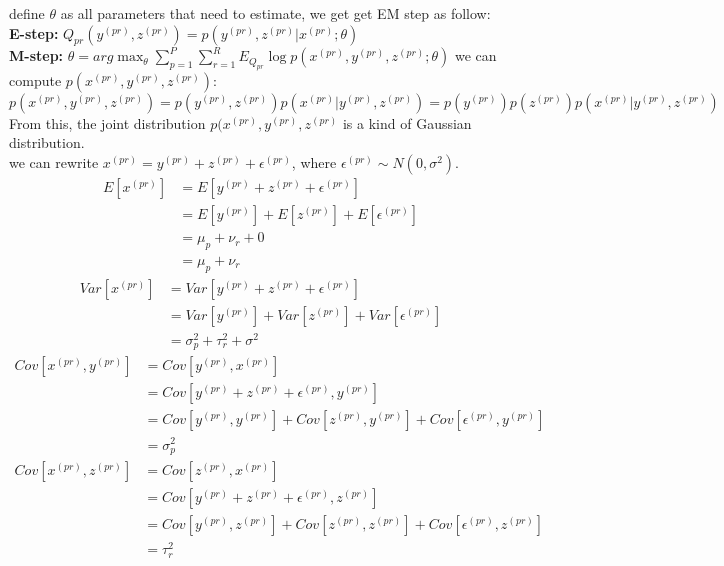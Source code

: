 \documentclass{article}
\theoremstyle{definition}
\theoremstyle{definition}
\theoremstyle{remark}
\begin{document}
define $\theta$ as all parameters that need to estimate, we get get EM step as follow:\\
\textbf{E-step:} $ Q_{pr}(y^{(pr)},z^{(pr)})= p(y^{(pr)},z^{(pr)}|x^{(pr)};\theta)$\\
\textbf{M-step:} $ \theta= arg\max_{\theta}\sum_{p=1}^{P}\sum_{r=1}^{R}E_{Q_{pr}}\log p(x^{(pr)},y^{(pr)},z^{(pr)};\theta)$
we can compute $p(x^{(pr)},y^{(pr)},z^{(pr)})$:
\[p(x^{(pr)},y^{(pr)},z^{(pr)})=p(y^{(pr)},z^{(pr)})p(x^{(pr)}|y^{(pr)},z^{(pr)})=p(y^{(pr)})p(z^{(pr)})p(x^{(pr)}|y^{(pr)},z^{(pr)})\]
From this, the joint distribution $p(x^{(pr)},y^{(pr)},z^{(pr)}$ is a kind of Gaussian distribution.\\
we can rewrite $x^{(pr)}=y^{(pr)}+z^{(pr)}+\epsilon^{(pr)}$, where $\epsilon^{(pr)}\sim N(0,\sigma^2)$.
\begin{equation}\nonumber
\begin{aligned}
E[x^{(pr)}]&=E[y^{(pr)}+z^{(pr)}+\epsilon^{(pr)}]\\
&=E[y^{(pr)}]+E[z^{(pr)}]+E[\epsilon^{(pr)}]\\
&=\mu_p+\nu_r+0\\
&=\mu_p+\nu_r
\end{aligned}
\end{equation}
\begin{equation}\nonumber
\begin{aligned}
Var[x^{(pr)}]&=Var[y^{(pr)}+z^{(pr)}+\epsilon^{(pr)}]\\
&=Var[y^{(pr)}]+Var[z^{(pr)}]+Var[\epsilon^{(pr)}]\\
&=\sigma_p^2+\tau_r^2+\sigma^2
\end{aligned}
\end{equation}
\begin{equation}\nonumber
\begin{aligned}
Cov[x^{(pr)},y^{(pr)}]&=Cov[y^{(pr)},x^{(pr)}]\\
&=Cov[y^{(pr)}+z^{(pr)}+\epsilon^{(pr)},y^{(pr)}]\\
&=Cov[y^{(pr)},y^{(pr)}]+Cov[z^{(pr)},y^{(pr)}]+Cov[\epsilon^{(pr)},y^{(pr)}]\\
&=\sigma_p^2
\end{aligned}
\end{equation}
\begin{equation}\nonumber
\begin{aligned}
Cov[x^{(pr)},z^{(pr)}]&=Cov[z^{(pr)},x^{(pr)}]\\
&=Cov[y^{(pr)}+z^{(pr)}+\epsilon^{(pr)},z^{(pr)}]\\
&=Cov[y^{(pr)},z^{(pr)}]+Cov[z^{(pr)},z^{(pr)}]+Cov[\epsilon^{(pr)},z^{(pr)}]\\
&=\tau_r^2
\end{aligned}
\end{equation}
\end{document}
